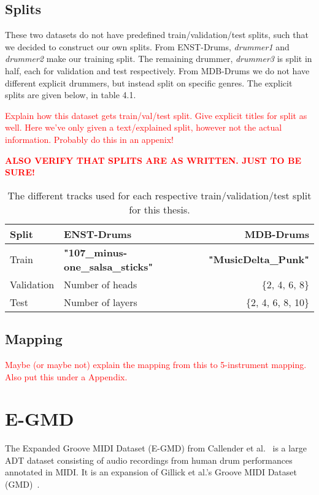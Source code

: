 \subsection{Splits}

These two datasets do not have predefined train/validation/test splits, such that we decided to construct our own splits. From ENST-Drums, \textit{drummer1} and \textit{drummer2} make our training split. The remaining drummer, \textit{drummer3} is split in half, each for validation and test respectively. From MDB-Drums we do not have different explicit drummers, but instead split on specific genres. The explicit splits are given below, in table 4.1.

\textcolor{red}{Explain how this dataset gets train/val/test split. Give explicit titles for split as well. Here we've only given a text/explained split, however not the actual information. Probably do this in an appenix!}

\textcolor{red}{\textbf{ALSO VERIFY THAT SPLITS ARE AS WRITTEN. JUST TO BE SURE!}}


\begin{table}[H]
    \centering
    \begin{tabular}{l|lr}
        Split & ENST-Drums & MDB-Drums \\
        \hline
        Train & \textbf{"107\_minus-one\_salsa\_sticks"}      & \textbf{"MusicDelta\_Punk"} \\
        Validation & Number of heads     & \{2, 4, 6, 8\} \\
        Test & Number of layers      & \{2, 4, 6, 8, 10\} \\
    \end{tabular}
    \caption{The different tracks used for each respective train/validation/test split for this thesis.}
    \label{ENST+MDBSplits}
\end{table}

\subsection{Mapping}

\textcolor{red}{Maybe (or maybe not) explain the mapping from this to 5-instrument mapping. Also put this under a Appendix.}

\section{E-GMD}

The Expanded Groove MIDI Dataset (E-GMD) from Callender et al.~\cite{callender2020improvingperceptualqualitydrum} is a large \gls{ADT} dataset consisting of audio recordings from human drum performances annotated in MIDI. It is an expansion of Gillick et al.'s Groove MIDI Dataset (GMD)~\cite{pmlr-v97-gillick19a}.

